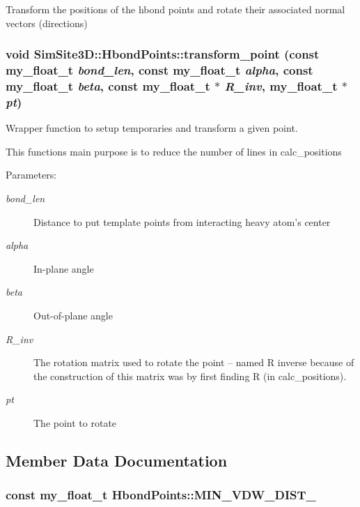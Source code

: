 Transform the positions of the hbond points and rotate their associated normal vectors (directions) 
\subsubsection{\setlength{\rightskip}{0pt plus 5cm}void SimSite3D::Hbond\-Points::transform\_\-point (const my\_\-float\_\-t {\em bond\_\-len}, const my\_\-float\_\-t {\em alpha}, const my\_\-float\_\-t {\em beta}, const my\_\-float\_\-t $\ast$ {\em R\_\-inv}, my\_\-float\_\-t $\ast$ {\em pt})\hspace{0.3cm}{\tt  [private]}}\label{classSimSite3D_1_1HbondPoints_ddac8742752fc700af5512d4ee7b4d75}


Wrapper function to setup temporaries and transform a given point. 

This functions main purpose is to reduce the number of lines in calc\_\-positions

\begin{Desc}
\item[Parameters:]
\begin{description}
\item[{\em bond\_\-len}]Distance to put template points from interacting heavy atom's center \item[{\em alpha}]In-plane angle \item[{\em beta}]Out-of-plane angle \item[{\em R\_\-inv}]The rotation matrix used to rotate the point -- named R inverse because of the construction of this matrix was by first finding R (in calc\_\-positions). \item[{\em pt}]The point to rotate \end{description}
\end{Desc}


\subsection{Member Data Documentation}
\subsubsection{\setlength{\rightskip}{0pt plus 5cm}const my\_\-float\_\-t \bf{Hbond\-Points::MIN\_\-VDW\_\-DIST\_}\hspace{0.3cm}{\tt  [static, private]}}\label{classSimSite3D_1_1HbondPoints_c3782b5110cb3ebf7c9c81fe98bac1a8}


